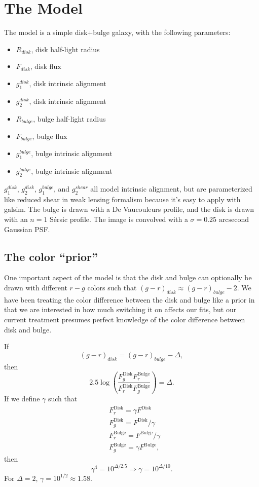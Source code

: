 \documentclass{article}
\newcommand{\Fd}{F^\textrm{Disk}}
\newcommand{\Fb}{F^\textrm{Bulge}}
\begin{document}
\section{The Model}
The model is a simple disk+bulge galaxy, with the following parameters:
\begin{itemize}
\item $R_{disk}$, disk half-light radius
\item $F_{disk}$, disk flux
\item $g_1^{disk}$, disk intrinsic alignment
\item $g_2^{disk}$, disk intrinsic alignment
\item $R_{bulge}$, bulge half-light radius
\item $F_{bulge}$, bulge flux
\item $g_1^{bulge}$, bulge intrinsic alignment
\item $g_2^{bulge}$, bulge intrinsic alignment
\end{itemize}
$g_1^{disk}$, $g_2^{disk}$, $g_1^{bulge}$, and $g_2^{shear}$ all model
intrinsic alignment, but are parameterized like reduced shear in weak
lensing formalism because it's easy to apply with galsim.  The bulge
is drawn with a De Vaucouleurs profile, and the disk is drawn with an
$n=1$ S\'{e}rsic profile.  The image is convolved with a $\sigma = 0.25
\textrm{ arcsecond}$ Gaussian PSF.

\subsection{The color ``prior''}
One important aspect of the model is that the disk and bulge can
optionally be drawn with different $r-g$ colors such that
$(g-r)_{disk} \approx (g-r)_{bulge} - 2$.  We have
been treating the color difference between the disk and bulge like a
prior in that we are interested in how much switching it on affects
our fits, but our current treatment presumes perfect knowledge of the
color difference between disk and bulge.

If
\[
(g-r)_{disk} = (g-r)_{bulge} - \Delta,
\]
then
\[
2.5 \log \left(  \frac{F_g^\textrm{Disk} F_r^\textrm{Bulge}}
{F_r^\textrm{Disk} F_g^\textrm{Bulge}} \right) = \Delta.
\]
If we define $\gamma$ such that
\begin{align*}
&\Fd_r = \gamma \Fd\\
&\Fd_g = \Fd / \gamma\\
&\Fb_r = \Fb / \gamma\\
&\Fb_g = \gamma \Fb,
\end{align*}
then
\[
\gamma^4 = 10^{\Delta/2.5} \Rightarrow
 \gamma = 10^{\Delta/10}.
\]
For $\Delta = 2$, $\gamma = 10^{1/2} \approx 1.58$.
\end{document}
